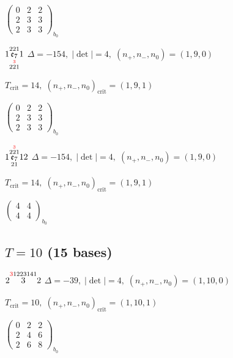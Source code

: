 \documentclass[10pt]{article}
\begin{document}
\hspace{2em}$\left(\begin{smallmatrix}0 & 2 & 2 \\ 2 & 3 & 3 \\ 2 & 3 & 3\end{smallmatrix}\right)_{\!b_0}$

\smallskip

$1\overset{221}{\underset{2\overset{\textcolor{red}{3}}{2}1}{\mathfrak{e}_7}}1$ \quad $\Delta=-154,\; |\det|=4,\; (n_+,n_-,n_0)=(1,9,0)$

\hspace{1em}$T_{\text{crit}}=14,\; (n_+,n_-,n_0)_{\text{crit}}=(1,9,1)$

\hspace{2em}$\left(\begin{smallmatrix}0 & 2 & 2 \\ 2 & 3 & 3 \\ 2 & 3 & 3\end{smallmatrix}\right)_{\!b_0}$

\smallskip

$1\overset{2\overset{\textcolor{red}{3}}{2}1}{\underset{21}{\mathfrak{e}_7}}12$ \quad $\Delta=-154,\; |\det|=4,\; (n_+,n_-,n_0)=(1,9,0)$

\hspace{1em}$T_{\text{crit}}=14,\; (n_+,n_-,n_0)_{\text{crit}}=(1,9,1)$

\hspace{2em}$\left(\begin{smallmatrix}4 & 4 \\ 4 & 4\end{smallmatrix}\right)_{\!b_0}$


\subsection*{$T = 10$ \quad (15 bases)}
\smallskip

$2\overset{\textcolor{red}{3}1223141}{3}2$ \quad $\Delta=-39,\; |\det|=4,\; (n_+,n_-,n_0)=(1,10,0)$

\hspace{1em}$T_{\text{crit}}=10,\; (n_+,n_-,n_0)_{\text{crit}}=(1,10,1)$

\hspace{2em}$\left(\begin{smallmatrix}0 & 2 & 2 \\ 2 & 4 & 6 \\ 2 & 6 & 8\end{smallmatrix}\right)_{\!b_0}$
\end{document}
